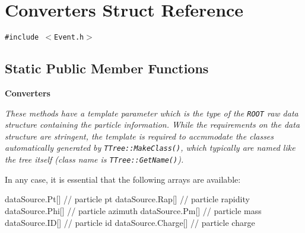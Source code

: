 \hypertarget{structConverters}{
\section{Converters Struct Reference}
\label{structConverters}
}
{\tt \#include $<$Event.h$>$}

\subsection*{Static Public Member Functions}
\begin{Indent}{\bf Converters}\par
{\em These methods have a template parameter which is the type of the {\tt ROOT} raw data structure containing the particle information. While the requirements on the data structure are stringent, the template is required to accmmodate the classes automatically generated by {\tt TTree::Make\-Class()}, which typically are named like the tree itself (class name is {\tt TTree::Get\-Name()}).

In any case, it is essential that the following arrays are available:

data\-Source.Pt\mbox{[}\mbox{]} // particle pt data\-Source.Rap\mbox{[}\mbox{]} // particle rapidity data\-Source.Phi\mbox{[}\mbox{]} // particle azimuth data\-Source.Pm\mbox{[}\mbox{]} // particle mass data\-Source.ID\mbox{[}\mbox{]} // particle id data\-Source.Charge\mbox{[}\mbox{]} // particle charge

}
\end{Indent}
